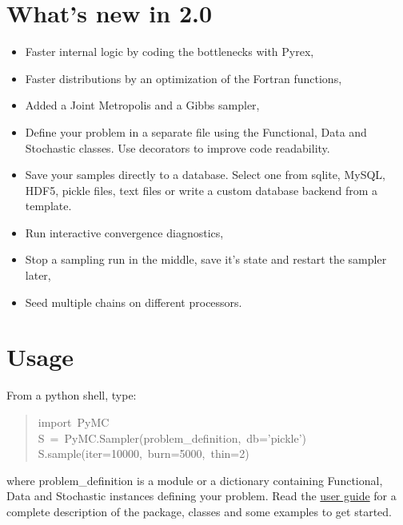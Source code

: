 \section*{What's new in 2.0}
\label{what-s-new-in-2-0}
\begin{itemize}
\item {} 
Faster internal logic by coding the bottlenecks with Pyrex,

\item {} 
Faster distributions by an optimization of the Fortran functions,

\item {} 
Added a Joint Metropolis and a Gibbs sampler,

\item {} 
Define your problem in a separate file using the Functional, Data and Stochastic
classes. Use decorators to improve code readability.

\item {} 
Save your samples directly to a database. Select one from sqlite, MySQL, HDF5,
pickle files, text files or write a custom database backend from a template.

\item {} 
Run interactive convergence diagnostics,

\item {} 
Stop a sampling run in the middle, save it's state and restart the sampler
later,

\item {} 
Seed multiple chains on different processors.

\end{itemize}



\hypertarget{usage}{}
\section*{Usage}
\label{usage}

From a python shell, type:
\begin{quote}{\ttfamily \raggedright \noindent
import~PyMC~\\
S~=~PyMC.Sampler(problem{\_}definition,~db='pickle')~\\
S.sample(iter=10000,~burn=5000,~thin=2)
}\end{quote}

where problem{\_}definition is a module or a dictionary containing Functional, Data and
Stochastic instances defining your problem. Read the \href{docs/pdf/new_interface.pdf}{user guide} for a
complete description of the package, classes and some examples to get started.


